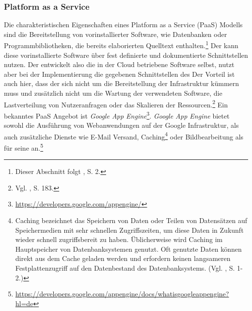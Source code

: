 \subsubsection{Platform as a Service}
Die charakteristischen Eigenschaften eines Platform as a Service (\acs{PaaS}) Modells sind die Bereitstellung von vorinstallierter Software, wie Datenbanken oder Programmbibliotheken, die bereits elaborierten Quelltext enthalten.\footnote{Dieser Abschnitt folgt \cite{Mell.2011}, S. 2.}\saveFN{\MellAbsatz}
Der \CSU kann diese vorinstallierte Software über fest definierte und dokumentierte Schnittstellen nutzen. 
Der \CSU entwickelt also die in der Cloud betriebene Software selbst, nutzt aber bei der Implementierung die gegebenen Schnittstellen des \CSPsDot
Der Vorteil ist auch hier, dass der \CSU sich nicht um die Bereitstellung der \CC Infrastruktur kümmern muss und zusätzlich nicht um die Wartung der verwendeten Software, die Lastverteilung von Nutzeranfragen oder das Skalieren der Ressourcen.\footnote{Vgl. \cite{Marston.2011}, S. 183.}
\newline
Ein bekanntes \acs{PaaS} Angebot ist \emph{Google App Engine}\footnote{\url{https://developers.google.com/appengine/}}. \emph{Google App Engine} bietet sowohl die Ausführung von Webanwendungen auf der Google Infrastruktur, als auch zusätzliche Dienste wie E-Mail Versand, Caching\footnote{Caching bezeichnet das Speichern von Daten oder Teilen von Datensätzen auf Speichermedien mit sehr schnellen Zugriffszeiten, um diese Daten in Zukunft wieder schnell zugriffsbereit zu haben. Üblicherweise wird Caching im Hauptspeicher von Datenbanksystemen genutzt. Oft genutzte Daten können direkt aus dem Cache geladen werden und erfordern keinen langsameren  Festplattenzugriff auf den Datenbestand des Datenbanksystems. (Vgl. \cite{Wessels.2001}, S. 1-2.)} oder Bildbearbeitung als \CS für seine \CSU an.\footnote{\url{https://developers.google.com/appengine/docs/whatisgoogleappengine?hl=de}}

